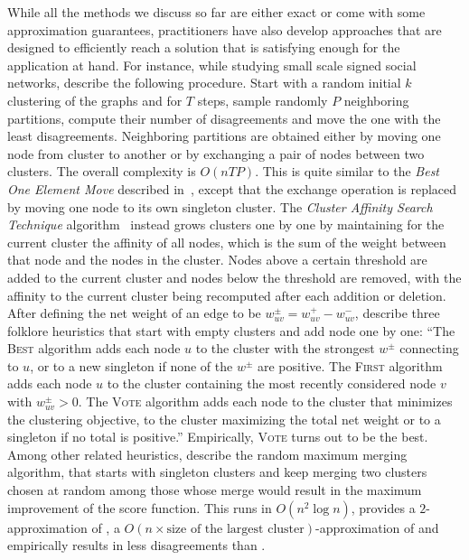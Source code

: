 While all the methods we discuss so far
are either exact or come with some approximation guarantees, practitioners have also develop
approaches that are designed to efficiently reach a solution that is satisfying enough for the
application at hand. For instance, while studying small scale signed social networks,
\textcite{Early96} describe the following procedure. Start with a random initial $k$ clustering of
the graphs and for $T$ steps, sample randomly $P$ neighboring partitions, compute their number of
disagreements and move the one with the least disagreements. Neighboring partitions are obtained
either by moving one node from cluster to another or by exchanging a pair of nodes between two
clusters. The overall complexity is $O(nTP)$. This is quite similar to the \emph{Best One Element
Move} described in~\autocite{Gionis2007}, except that the exchange operation is replaced by moving
one node to its own singleton cluster. The \emph{Cluster Affinity Search Technique}
algorithm~\textcite{Ben-Dor99} instead grows clusters one by one by maintaining for the current
cluster the affinity of all nodes, which is the sum of the weight between that node and the nodes in
the cluster. Nodes above a certain threshold are added to the current cluster and nodes below the
threshold are removed, with the affinity to the current cluster being recomputed after each addition
or deletion. After defining the net weight of an edge to be $w^\pm_{uv} = w^+_{uv} - w^-_{uv}$,
\textcite{Elsner2009} describe three folklore heuristics that start with empty clusters and add node
one by one: \enquote{The \textsc{Best} algorithm adds each node $u$ to the cluster with the
strongest $w^\pm$ connecting to $u$, or to a new singleton if none of the $w^\pm$ are positive.
The \textsc{First} algorithm adds each node $u$ to the cluster containing the most recently
considered node $v$ with $w^\pm_{uv} > 0$. The \textsc{Vote} algorithm adds each node to the cluster
that minimizes the \pcc{} clustering objective, \ie{} to the cluster maximizing the total net weight
or to a singleton if no total is positive.} Empirically, \textsc{Vote} turns out to be the best.
Among other related heuristics, \textcite{mergingHeuristics14} describe the random maximum merging
algorithm, that starts with singleton clusters and keep merging two clusters chosen at random among
those whose merge would result in the maximum improvement of the score function.  This runs in
$O(n^2\log n)$, provides a $2$-approximation of \maxa{}, a $O(n\times \text{size of the largest
cluster})$-approximation of \mind and empirically results in less disagreements than \ccpivot{}.
